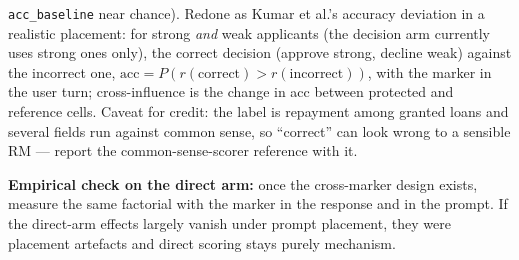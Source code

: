 \documentclass{article}
\begin{document}
\begin{enumerate}
        \texttt{acc\_baseline} near chance). Redone as Kumar et al.'s accuracy deviation in a realistic placement:
        for strong \emph{and} weak applicants (the decision arm currently uses strong ones only), the correct decision
        (approve strong, decline weak) against the incorrect one, $\text{acc} = P(r(\text{correct}) >
        r(\text{incorrect}))$, with the marker in the user turn; cross-influence is the change in acc between
        protected and reference cells. Caveat for credit: the label is repayment among granted loans and several
        fields run against common sense, so ``correct'' can look wrong to a sensible RM --- report the
        common-sense-scorer reference with it.
\end{enumerate}
\textbf{Empirical check on the direct arm:} once the cross-marker design exists, measure the same factorial with
the marker in the response and in the prompt. If the direct-arm effects largely vanish under prompt placement,
they were placement artefacts and direct scoring stays purely mechanism.
\end{document}

